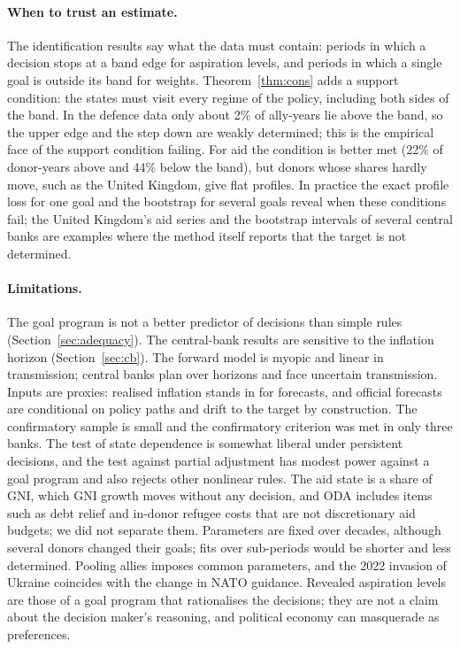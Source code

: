 \documentclass[pdflatex,sn-basic]{sn-jnl}
\theoremstyle{thmstyleone}\newtheorem{proposition}{Proposition}\newtheorem{theorem}{Theorem}
\theoremstyle{thmstylethree}\newtheorem{remark}{Remark}
\begin{document}
\paragraph{When to trust an estimate.} The identification results say what the data must contain: periods in which a decision stops at a band edge for aspiration levels, and periods in which a single goal is outside its band for weights. Theorem~\ref{thm:cons} adds a support condition: the states must visit every regime of the policy, including both sides of the band. In the defence data only about 2\% of ally-years lie above the band, so the upper edge and the step down are weakly determined; this is the empirical face of the support condition failing. For aid the condition is better met (22\% of donor-years above and 44\% below the band), but donors whose shares hardly move, such as the United Kingdom, give flat profiles. In practice the exact profile loss for one goal and the bootstrap for several goals reveal when these conditions fail; the United Kingdom's aid series and the bootstrap intervals of several central banks are examples where the method itself reports that the target is not determined.
\paragraph{Limitations.} The goal program is not a better predictor of decisions than simple rules (Section~\ref{sec:adequacy}). The central-bank results are sensitive to the inflation horizon (Section~\ref{sec:cb}). The forward model is myopic and linear in transmission; central banks plan over horizons and face uncertain transmission. Inputs are proxies: realised inflation stands in for forecasts, and official forecasts are conditional on policy paths and drift to the target by construction. The confirmatory sample is small and the confirmatory criterion was met in only three banks. The test of state dependence is somewhat liberal under persistent decisions, and the test against partial adjustment has modest power against a goal program and also rejects other nonlinear rules. The aid state is a share of GNI, which GNI growth moves without any decision, and ODA includes items such as debt relief and in-donor refugee costs that are not discretionary aid budgets; we did not separate them. Parameters are fixed over decades, although several donors changed their goals; fits over sub-periods would be shorter and less determined. Pooling allies imposes common parameters, and the 2022 invasion of Ukraine coincides with the change in NATO guidance. Revealed aspiration levels are those of a goal program that rationalises the decisions; they are not a claim about the decision maker's reasoning, and political economy can masquerade as preferences.
\end{document}
